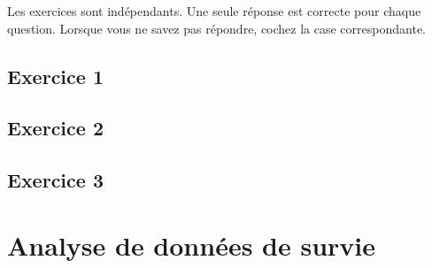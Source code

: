 Les exercices sont indépendants. Une seule réponse est correcte pour chaque
question. Lorsque vous ne savez pas répondre, cochez la case correspondante.

\section*{Exercice 1}

\section*{Exercice 2}

\section*{Exercice 3}


\chapter{Analyse de données de survie}

